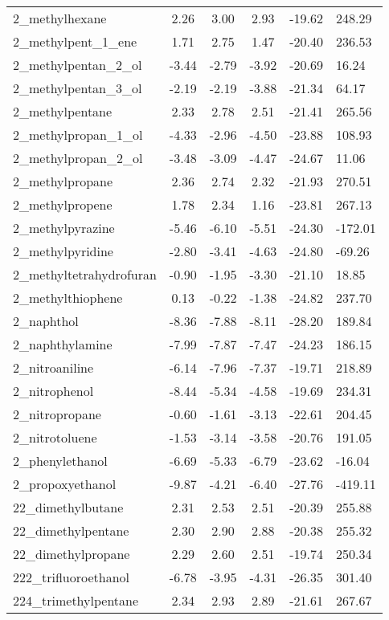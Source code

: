 \documentclass{amsart}
\begin{document}
\begin{longtable}{L|C|C|C|X|X}
2\_methylhexane & 2.26 & 3.00 & 2.93 & -19.62 & 248.29 \\ 
2\_methylpent\_1\_ene & 1.71 & 2.75 & 1.47 & -20.40 & 236.53 \\ 
2\_methylpentan\_2\_ol & -3.44 & -2.79 & -3.92 & -20.69 & 16.24 \\ 
2\_methylpentan\_3\_ol & -2.19 & -2.19 & -3.88 & -21.34 & 64.17 \\ 
2\_methylpentane & 2.33 & 2.78 & 2.51 & -21.41 & 265.56 \\ 
2\_methylpropan\_1\_ol & -4.33 & -2.96 & -4.50 & -23.88 & 108.93 \\ 
2\_methylpropan\_2\_ol & -3.48 & -3.09 & -4.47 & -24.67 & 11.06 \\ 
2\_methylpropane & 2.36 & 2.74 & 2.32 & -21.93 & 270.51 \\ 
2\_methylpropene & 1.78 & 2.34 & 1.16 & -23.81 & 267.13 \\ 
2\_methylpyrazine & -5.46 & -6.10 & -5.51 & -24.30 & -172.01 \\ 
2\_methylpyridine & -2.80 & -3.41 & -4.63 & -24.80 & -69.26 \\ 
2\_methyltetrahydrofuran & -0.90 & -1.95 & -3.30 & -21.10 & 18.85 \\ 
2\_methylthiophene & 0.13 & -0.22 & -1.38 & -24.82 & 237.70 \\ 
2\_naphthol & -8.36 & -7.88 & -8.11 & -28.20 & 189.84 \\ 
2\_naphthylamine & -7.99 & -7.87 & -7.47 & -24.23 & 186.15 \\ 
2\_nitroaniline & -6.14 & -7.96 & -7.37 & -19.71 & 218.89 \\ 
2\_nitrophenol & -8.44 & -5.34 & -4.58 & -19.69 & 234.31 \\ 
2\_nitropropane & -0.60 & -1.61 & -3.13 & -22.61 & 204.45 \\ 
2\_nitrotoluene & -1.53 & -3.14 & -3.58 & -20.76 & 191.05 \\ 
2\_phenylethanol & -6.69 & -5.33 & -6.79 & -23.62 & -16.04 \\ 
2\_propoxyethanol & -9.87 & -4.21 & -6.40 & -27.76 & -419.11 \\ 
22\_dimethylbutane & 2.31 & 2.53 & 2.51 & -20.39 & 255.88 \\ 
22\_dimethylpentane & 2.30 & 2.90 & 2.88 & -20.38 & 255.32 \\ 
22\_dimethylpropane & 2.29 & 2.60 & 2.51 & -19.74 & 250.34 \\ 
222\_trifluoroethanol & -6.78 & -3.95 & -4.31 & -26.35 & 301.40 \\ 
224\_trimethylpentane & 2.34 & 2.93 & 2.89 & -21.61 & 267.67 \\ 

\end{longtable}
\end{document}
